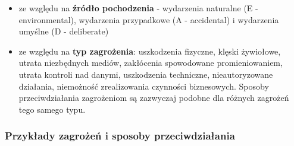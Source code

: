 \begin{itemize}
	\item ze względu na \textbf{źródło pochodzenia} - wydarzenia naturalne (E - environmental), wydarzenia przypadkowe (A - accidental) i wydarzenia umyślne (D - deliberate)
	\item ze względu na \textbf{typ zagrożenia}: uszkodzenia fizyczne, klęski żywiołowe, utrata niezbędnych mediów, zakłócenia spowodowane promieniowaniem, utrata kontroli nad danymi, uszkodzenia techniczne, nieautoryzowane działania, niemożność zrealizowania czynności biznesowych. Sposoby przeciwdziałania zagrożeniom są zazwyczaj podobne dla różnych zagrożeń tego samego typu.
\end{itemize}

\subsubsection{Przykłady zagrożeń i sposoby przeciwdziałania}

